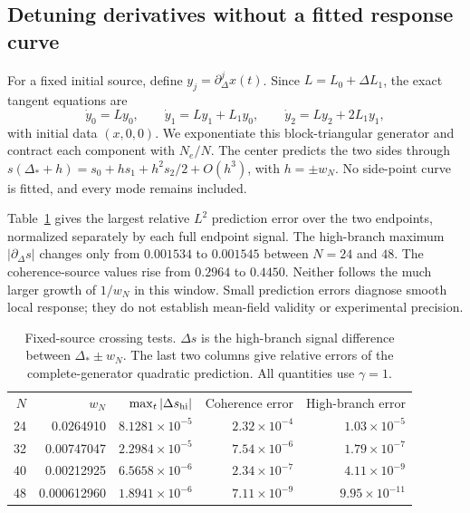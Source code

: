 \documentclass[aps,pra,10pt,onecolumn,superscriptaddress,amsmath,amssymb]{revtex4-2}
\begin{document}
\subsection{Detuning derivatives without a fitted response curve}
For a fixed initial source, define $y_j=\partial_\Delta^j x(t)$. Since $L=L_0+\Delta L_1$, the exact tangent equations are
\begin{equation}
 \dot y_0=Ly_0,\qquad
 \dot y_1=Ly_1+L_1y_0,\qquad
 \dot y_2=Ly_2+2L_1y_1,
 \label{eq:tangent}
\end{equation}
with initial data $(x,0,0)$. We exponentiate this block-triangular generator and contract each component with $N_e/N$. The center predicts the two sides through $s(\Delta_*+h)=s_0+h s_1+h^2s_2/2+O(h^3)$, with $h=\pm w_N$. No side-point curve is fitted, and every mode remains included.

Table~\ref{tab:effects} gives the largest relative $L^2$ prediction error over the two endpoints, normalized separately by each full endpoint signal. The high-branch maximum $|\partial_\Delta s|$ changes only from $0.001534$ to $0.001545$ between $N=24$ and $48$. The coherence-source values rise from $0.2964$ to $0.4450$. Neither follows the much larger growth of $1/w_N$ in this window. Small prediction errors diagnose smooth local response; they do not establish mean-field validity or experimental precision.
\begin{table}[ht]
\caption{Fixed-source crossing tests. $\Delta s$ is the high-branch signal difference between $\Delta_*\pm w_N$. The last two columns give relative errors of the complete-generator quadratic prediction. All quantities use $\gamma=1$.}
\label{tab:effects}
\begin{ruledtabular}
\begin{tabular}{rrrrr}
$N$&$w_N$&$\max_t|\Delta s_{\rm hi}|$&Coherence error&High-branch error\\
24&0.0264910&$8.1281\times10^{-5}$&$2.32\times10^{-4}$&$1.03\times10^{-5}$\\
32&0.00747047&$2.2984\times10^{-5}$&$7.54\times10^{-6}$&$1.79\times10^{-7}$\\
40&0.00212925&$6.5658\times10^{-6}$&$2.34\times10^{-7}$&$4.11\times10^{-9}$\\
48&0.000612960&$1.8941\times10^{-6}$&$7.11\times10^{-9}$&$9.95\times10^{-11}$
\end{tabular}
\end{ruledtabular}
\end{table}
\end{document}
